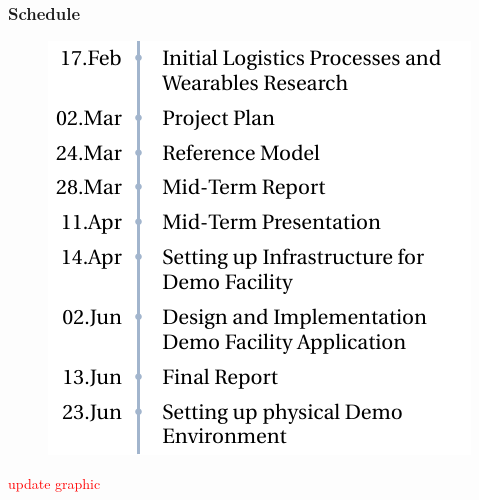 \begin{frame}\frametitle{Schedule}
\begin{figure}
	\includegraphics[scale=0.9]{images/TimeLine}
\end{figure}
\textcolor{red}{update graphic}
\end{frame}
